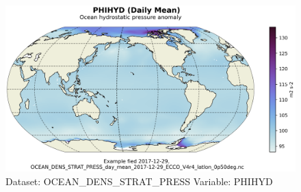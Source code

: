 \begin{figure}[H]
\centering
\includegraphics[scale=0.55]{../images/plots/latlon_plots/Ocean_Density_Stratification_and_Hydrostatic_Pressure/PHIHYD.png}
\caption{Dataset: OCEAN\_DENS\_STRAT\_PRESS Variable: PHIHYD}
\label{tab:table-OCEAN_DENS_STRAT_PRESS_PHIHYD-Plot}
\end{figure}
\pagebreak
